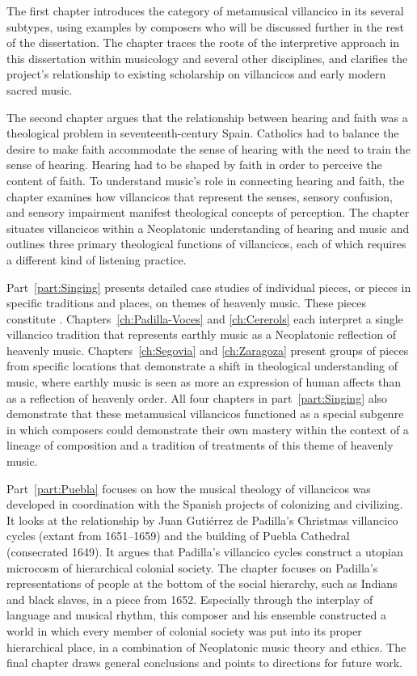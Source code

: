 The first chapter introduces the category of metamusical villancico in its several subtypes, using examples by composers who will be discussed further in the rest of the dissertation.
The chapter traces the roots of the interpretive approach in this dissertation within musicology and several other disciplines, and clarifies the project's relationship to existing scholarship on villancicos and early modern sacred music.

The second chapter argues that the relationship between hearing and faith was a theological problem in seventeenth-century Spain. 
Catholics had to balance the desire to make faith accommodate the sense of hearing with the need to train the sense of hearing.
Hearing had to be shaped by faith in order to perceive the content of faith.
To understand music's role in connecting hearing and faith, the chapter examines how villancicos that represent the senses, sensory confusion, and sensory impairment manifest theological concepts of perception.
The chapter situates villancicos within a Neoplatonic understanding of hearing and music and outlines three primary theological functions of villancicos, each of which requires a different kind of listening practice.

Part~\ref{part:Singing} presents detailed case studies of individual pieces, or pieces in specific traditions and places, on themes of heavenly music. 
These pieces constitute . 
Chapters~\ref{ch:Padilla-Voces} and \ref{ch:Cererols} each interpret a single villancico tradition that represents earthly music as a Neoplatonic reflection of heavenly music.
Chapters~\ref{ch:Segovia} and \ref{ch:Zaragoza} present groups of pieces from specific locations that demonstrate a shift in theological understanding of music, where earthly music is seen as more an expression of human affects than as a reflection of heavenly order.
All four chapters in part~\ref{part:Singing} also demonstrate that these metamusical villancicos functioned as a special subgenre in which composers could demonstrate their own mastery within the context of a lineage of composition and a tradition of treatments of this theme of heavenly music.

Part~\ref{part:Puebla} focuses on how the musical theology of villancicos was developed in coordination with the Spanish projects of colonizing and civilizing.
It looks at the relationship by Juan Gutiérrez de Padilla's Christmas villancico cycles (extant from 1651--1659) and the building of Puebla Cathedral (consecrated 1649).
It argues that Padilla's villancico cycles construct a utopian microcosm of hierarchical colonial society.
The chapter focuses on Padilla's representations of people at the bottom of the social hierarchy, such as Indians and black slaves, in a piece from 1652.
Especially through the interplay of language and musical rhythm, this composer and his ensemble constructed a world in which every member of colonial society was put into its proper hierarchical place, in a combination of Neoplatonic music theory and ethics.
The final chapter draws general conclusions and points to directions for future work.

